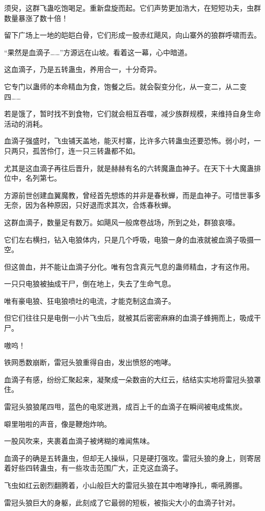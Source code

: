 \begin{this_body}
须臾，这群飞蛊吃饱喝足。重新盘旋而起。它们声势更加浩大，在短短功夫，虫群数量暴涨了数十倍！

留下广场上一地的皑皑白骨，它们形成一股赤红飓风，向山寨外的狼群呼啸而去。

“果然是血滴子……”方源远在山坡。看着这一幕，心中暗道。

这血滴子，乃是五转蛊虫，养用合一，十分奇异。

它专门以蛊师的本命精血为食，饱餐之后。就会裂变分化，从一变二，从二变四……

若是饿了，暂时找不到食物，它们就会相互吞噬，减少族群规模，来维持自身生命活动的消耗。

血滴子强盛时，飞虫铺天盖地，能灭村寨，比许多六转蛊虫还要恐怖。弱小时，一只两只，孤苦伶仃，连一只三转蛊都不如。

尤其是这血滴子再往后晋升，就是赫赫有名的六转魔蛊血神子。在天下十大魔蛊排位中，名列第七。

方源前世创建血翼魔教，曾经首先想炼的并非是春秋蝉，而是血神子。可惜世事多无奈，因为各种原因，只好退而求其次，合炼春秋蝉。

这群血滴子，数量足有数万。如飓风一般席卷战场，所到之处，群狼哀嚎。

它们左右横扫，钻入电狼体内，只是几个呼吸，电狼一身的血液就被血滴子吸摄一空。

但这兽血，并不能让血滴子分化。唯有包含真元气息的蛊师精血，才有这作用。

一只只电狼被抽成干尸，倒在地上，失去了生命气息。

唯有豪电狼、狂电狼喷吐的电流，才能克制这血滴子。

但它们往往只是电倒一小片飞虫后，就被其后密密麻麻的血滴子蜂拥而上，吸成干尸。

嗷呜！

铁网悉数崩断，雷冠头狼重得自由，发出愤怒的咆哮。

血滴子有感，纷纷汇聚起来，凝聚成一朵数亩的大红云，结结实实地将雷冠头狼罩住。

雷冠头狼狼尾四甩，蓝色的电浆迸溅，成百上千的血滴子在瞬间被电成焦炭。

噼里啪啦的声音，像是鞭炮炸响。

一股风吹来，夹裹着血滴子被烤糊的难闻焦味。

血滴子的确是五转蛊虫，但却无人操纵，只是硬打强攻。雷冠头狼的身上，则寄居着好些四转蛊虫，有一些攻击范围广大，正克这血滴子。

飞虫如红云剧烈翻腾着，小山般巨大的雷冠头狼在其中咆哮挣扎，嘶吼腾挪。

雷冠头狼巨大的身躯，此刻成了它最弱的短板，被指尖大小的血滴子针对。


\end{this_body}
